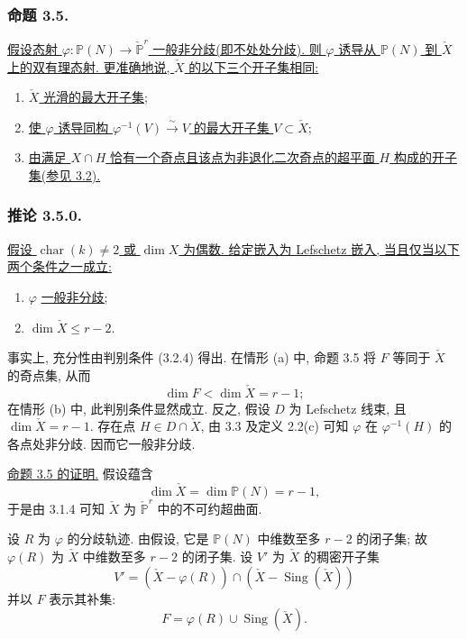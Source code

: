 \subsubsection*{命题 3.5.}
\underline{假设态射 $\varphi:\mathbb P(N)\to\check{\mathbb P}^{r}$ 一般非分歧(即不处处分歧). 则 $\varphi$ 诱导从 $\mathbb P(N)$ 到 $\check X$ 上的双有理态射. 更准确地说, $\check X$ 的以下三个开子集相同:}
\begin{enumerate}
\item[(a)] \underline{$\check X$ 光滑的最大开子集;}
\item[(b)] \underline{使 $\varphi$ 诱导同构 $\varphi^{-1}(V)\xrightarrow{\sim}V$ 的最大开子集 $V\subset\check X$;}
\item[(c)] \underline{由满足 $X\cap H$ 恰有一个奇点且该点为非退化二次奇点的超平面 $H$ 构成的开子集(参见 3.2).}
\end{enumerate}

\subsubsection*{推论 3.5.0.}
\underline{假设 $\operatorname{char}(k)\ne2$ 或 $\dim X$ 为偶数. 给定嵌入为 Lefschetz 嵌入, 当且仅当以下两个条件之一成立:}
\begin{enumerate}
\item[(a)] $\varphi$ \underline{一般非分歧;}
\item[(b)] $\dim\check X\leq r-2$.
\end{enumerate}

事实上, 充分性由判别条件 (3.2.4) 得出. 在情形 (a) 中, 命题 3.5 将 $F$ 等同于 $\check X$ 的奇点集, 从而
\[
\dim F<\dim\check X=r-1;
\]
在情形 (b) 中, 此判别条件显然成立. 反之, 假设 $D$ 为 Lefschetz 线束, 且 $\dim\check X=r-1$. 存在点 $H\in D\cap\check X$, 由 3.3 及定义 2.2(c) 可知 $\varphi$ 在 $\varphi^{-1}(H)$ 的各点处非分歧. 因而它一般非分歧.

\noindent\underline{命题 3.5 的证明.}
假设蕴含
\[
\dim\check X=\dim\mathbb P(N)=r-1,
\]
于是由 3.1.4 可知 $\check X$ 为 $\check{\mathbb P}^{r}$ 中的不可约超曲面.

设 $R$ 为 $\varphi$ 的分歧轨迹. 由假设, 它是 $\mathbb P(N)$ 中维数至多 $r-2$ 的闭子集; 故 $\varphi(R)$ 为 $\check X$ 中维数至多 $r-2$ 的闭子集. 设 $V'$ 为 $\check X$ 的稠密开子集
\begin{equation}\tag{3.5.1}
V'=(\check X-\varphi(R))\cap
   (\check X-\operatorname{Sing}(\check X))
\end{equation}
并以 $F$ 表示其补集:
\begin{equation}\tag{3.5.1.1}
F=\varphi(R)\cup\operatorname{Sing}(\check X).
\end{equation}

